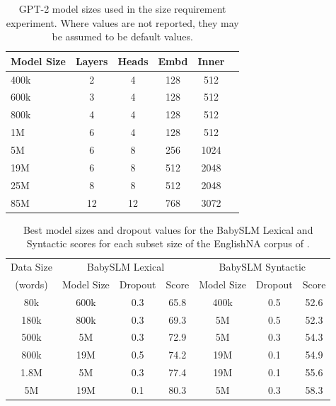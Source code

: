 \begin{table}[!ht]
    \centering
    \small
    \begin{tabular}{lccccc}
    \toprule
         Model Size & Layers & Heads & Embd & Inner \\
         \midrule
         400k & 2 & 4 & 128 & 512 \\ 
         600k & 3 & 4 & 128 & 512 \\ 
         800k & 4 & 4 & 128 & 512 \\ 
         1M & 6 & 4 & 128 & 512 \\ 
         5M & 6 & 8 & 256 & 1024 \\ 
         19M & 6 & 8 & 512 & 2048 \\ 
         25M & 8 & 8 & 512 & 2048 \\ 
         85M & 12 & 12 & 768 & 3072 \\ 
    \bottomrule
    \end{tabular}
    \caption{GPT-2 model sizes used in the size requirement experiment. Where values are not reported, they may be assumed to be default values.}
    \label{tab:13-model_sizes}
\end{table}

\begin{table}[t!]
    \centering
    \small
    \begin{tabular}{c|ccc|ccc}
    \toprule
         Data Size& \multicolumn{3}{c|}{BabySLM Lexical} & \multicolumn{3}{c}{BabySLM Syntactic} \\
         (words) & Model Size & Dropout & Score & Model Size & Dropout & Score \\
         \midrule
         80k & 600k & 0.3 & 65.8 & 400k & 0.5 & 52.6 \\ 
         180k & 800k & 0.3 & 69.3 & 5M & 0.5 & 52.3\\ 
         500k & 5M & 0.3 & 72.9 & 5M & 0.3 & 54.3\\ 
         800k & 19M & 0.5 & 74.2 & 19M & 0.1 & 54.9 \\ 
         1.8M & 5M & 0.3 & 77.4 & 19M & 0.1 & 55.6 \\ 
         5M & 19M & 0.1 & 80.3 & 5M & 0.3 & 58.3 \\ 
    \bottomrule
    \end{tabular}
    \caption{Best model sizes and dropout values for the BabySLM Lexical and Syntactic scores for each subset size of the EnglishNA corpus of \ipachildes.}
    \label{tab:13-best_sizes}
\end{table}

